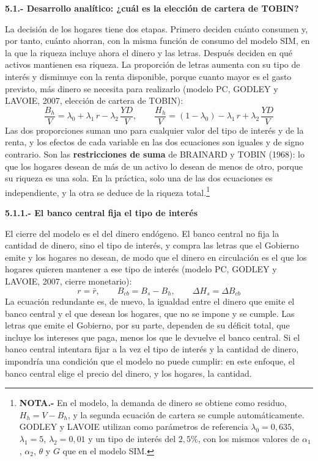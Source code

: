\documentclass[10pt,a4paper]{article}
\begin{document}
\textbf{5.1.- Desarrollo analítico: ¿cuál es la elección de cartera de TOBIN?}

La decisión de los hogares tiene dos etapas. Primero deciden cuánto consumen y, por tanto, cuánto ahorran, con la misma función de consumo del modelo SIM, en la que la riqueza incluye ahora el dinero y las letras. Después deciden en qué activos mantienen esa riqueza. La proporción de letras aumenta con su tipo de interés y disminuye con la renta disponible, porque cuanto mayor es el gasto previsto, más dinero se necesita para realizarlo (modelo PC, GODLEY y LAVOIE, 2007, elección de cartera de TOBIN):
$$\frac{B_h}{V}=\lambda_0+\lambda_1\,r-\lambda_2\,\frac{YD}{V},\qquad \frac{H_h}{V}=(1-\lambda_0)-\lambda_1\,r+\lambda_2\,\frac{YD}{V}$$
Las dos proporciones suman uno para cualquier valor del tipo de interés y de la renta, y los efectos de cada variable en las dos ecuaciones son iguales y de signo contrario. Son las \textbf{restricciones de suma} de BRAINARD y TOBIN (1968): lo que los hogares desean de más de un activo lo desean de menos de otro, porque su riqueza es una sola. En la práctica, solo una de las dos ecuaciones es independiente, y la otra se deduce de la riqueza total.\footnote{%
    \textbf{NOTA.-} En el modelo, la demanda de dinero se obtiene como residuo, $H_h=V-B_h$, y la segunda ecuación de cartera se cumple automáticamente. GODLEY y LAVOIE utilizan como parámetros de referencia $\lambda_0=0{,}635$, $\lambda_1=5$, $\lambda_2=0{,}01$ y un tipo de interés del $2{,}5\%$, con los mismos valores de $\alpha_1$, $\alpha_2$, $\theta$ y $G$ que en el modelo SIM.
}

\textbf{5.1.1.- El banco central fija el tipo de interés}

El cierre del modelo es el del dinero endógeno. El banco central no fija la cantidad de dinero, sino el tipo de interés, y compra las letras que el Gobierno emite y los hogares no desean, de modo que el dinero en circulación es el que los hogares quieren mantener a ese tipo de interés (modelo PC, GODLEY y LAVOIE, 2007, cierre monetario):
$$r=\bar{r},\qquad B_{cb}=B_s-B_h,\qquad \Delta H_s=\Delta B_{cb}$$
La ecuación redundante es, de nuevo, la igualdad entre el dinero que emite el banco central y el que desean los hogares, que no se impone y se cumple. Las letras que emite el Gobierno, por su parte, dependen de su déficit total, que incluye los intereses que paga, menos los que le devuelve el banco central. Si el banco central intentara fijar a la vez el tipo de interés y la cantidad de dinero, impondría una condición que el modelo no puede cumplir: en este enfoque, el banco central elige el precio del dinero, y los hogares, la cantidad.
\end{document}
